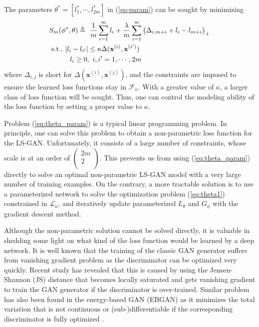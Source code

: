 The parameters $\theta^*=[l_1^*,\cdots,l_{2m}^*]$ in (\ref{eq:param}) can be sought by minimizing
\begin{align}\label{eq:theta_param}
& S_{m} (\phi^*,\theta) \triangleq ~\dfrac{1}{m} \sum_{i=1}^m {l_i} + \dfrac{\lambda}{m} \sum_{i=1}^{m} \big( \Delta_{i,m+i}
+ l_i - l_{m+i} \big)_+\nonumber \\
&~{\rm s.t.,}~|l_i - l_{i'}| \leq \kappa\Delta(\mathbf x^{(i)},\mathbf x^{(i')})\nonumber\\
&~~~~~~~~~l_i\geq 0,~i,i'=1,\cdots,2m
\end{align}
where $\Delta_{i,j}$ is short for $\Delta(\mathbf x^{(i)},\mathbf x^{(j)})$, and the constraints are imposed to ensure the learned loss functions stay in $\mathcal F_\kappa$.
With a greater value of $\kappa$, a larger class of loss function will be sought.  Thus, one can control the modeling ability of the loss function by setting a proper value to $\kappa$.

Problem (\ref{eq:theta_param}) is a typical linear programming problem. In principle, one can solve this problem to obtain a non-parametric loss function for the LS-GAN.
Unfortunately, it consists of a large number of constraints, whose scale is at an order of $\left( {\begin{array}{*{10}{c}}
   {2m}  \\
   2  \\
\end{array}} \right)$. This prevents us from using (\ref{eq:theta_param}) directly to solve an optimal non-parametric LS-GAN model with a very large number of training examples.
On the contrary, a more tractable solution is to use a parameterized network to solve the optimization problem (\ref{eq:theta1}) constrained in $\mathcal L_\kappa$, and iteratively update parameterized $L_\theta$ and $G_\phi$ with the gradient descent method.

Although the non-parametric solution cannot be solved directly, it is valuable in shedding some light on what kind of the loss function would be learned by a deep network. It is well known that the training of the classic GAN generator suffers from vanishing gradient problem as the discriminator can be optimized very quickly.  Recent study \cite{wgan17} has revealed that this is caused by using the Jensen-Shannon (JS) distance that becomes locally saturated and gets vanishing gradient to train the GAN generator if the discriminator is over-trained. Similar problem has also been found in the energy-based GAN (EBGAN) \cite{zhao2016energy} as it minimizes the total variation that is not continuous or (sub-)differentiable if the corresponding discriminator is fully optimized \cite{wgan17}.

